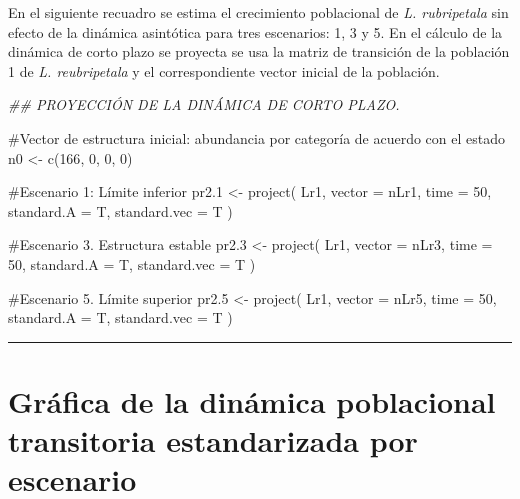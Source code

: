 \documentclass[
  12pt,
  letterpaper,
]{book}
\newenvironment{Shaded}{\begin{snugshade}}{\end{snugshade}}
\newcommand{\AttributeTok}[1]{\textcolor[rgb]{0.40,0.45,0.13}{#1}}
\newcommand{\CommentTok}[1]{\textcolor[rgb]{0.37,0.37,0.37}{#1}}
\newcommand{\DecValTok}[1]{\textcolor[rgb]{0.68,0.00,0.00}{#1}}
\newcommand{\DocumentationTok}[1]{\textcolor[rgb]{0.37,0.37,0.37}{\textit{#1}}}
\newcommand{\FloatTok}[1]{\textcolor[rgb]{0.68,0.00,0.00}{#1}}
\newcommand{\FunctionTok}[1]{\textcolor[rgb]{0.28,0.35,0.67}{#1}}
\newcommand{\NormalTok}[1]{\textcolor[rgb]{0.00,0.23,0.31}{#1}}
\newcommand{\OtherTok}[1]{\textcolor[rgb]{0.00,0.23,0.31}{#1}}
\begin{document}
En el siguiente recuadro se estima el crecimiento poblacional de
\emph{L. rubripetala} sin efecto de la dinámica asintótica para tres
escenarios: 1, 3 y 5. En el cálculo de la dinámica de corto plazo se
proyecta se usa la matriz de transición de la población 1 de \emph{L.
reubripetala} y el correspondiente vector inicial de la población.

\begin{Shaded}
\begin{Highlighting}[]
\DocumentationTok{\#\# PROYECCIÓN DE LA DINÁMICA DE CORTO PLAZO. }

\CommentTok{\#Vector de estructura inicial: abundancia por categoría de acuerdo con  el estado}
\NormalTok{n0 }\OtherTok{\textless{}{-}} \FunctionTok{c}\NormalTok{(}\DecValTok{166}\NormalTok{, }\DecValTok{0}\NormalTok{, }\DecValTok{0}\NormalTok{, }\DecValTok{0}\NormalTok{)}

\CommentTok{\#Escenario 1: Límite inferior}
\NormalTok{pr2}\FloatTok{.1} \OtherTok{\textless{}{-}} \FunctionTok{project}\NormalTok{(}
\NormalTok{  Lr1,}
  \AttributeTok{vector =}\NormalTok{ nLr1,}
  \AttributeTok{time =} \DecValTok{50}\NormalTok{,}
  \AttributeTok{standard.A =}\NormalTok{ T,}
  \AttributeTok{standard.vec =}\NormalTok{ T}
\NormalTok{)}

\CommentTok{\#Escenario 3. Estructura estable}
\NormalTok{pr2}\FloatTok{.3} \OtherTok{\textless{}{-}} \FunctionTok{project}\NormalTok{(}
\NormalTok{  Lr1,}
  \AttributeTok{vector =}\NormalTok{ nLr3,}
  \AttributeTok{time =} \DecValTok{50}\NormalTok{,}
  \AttributeTok{standard.A =}\NormalTok{ T,}
  \AttributeTok{standard.vec =}\NormalTok{ T}
\NormalTok{)}

\CommentTok{\#Escenario 5. Límite superior}
\NormalTok{pr2}\FloatTok{.5} \OtherTok{\textless{}{-}} \FunctionTok{project}\NormalTok{(}
\NormalTok{  Lr1,}
  \AttributeTok{vector =}\NormalTok{ nLr5,}
  \AttributeTok{time =} \DecValTok{50}\NormalTok{,}
  \AttributeTok{standard.A =}\NormalTok{ T,}
  \AttributeTok{standard.vec =}\NormalTok{ T}
\NormalTok{)}
\end{Highlighting}
\end{Shaded}

\begin{center}\rule{0.5\linewidth}{0.5pt}\end{center}

\section{Gráfica de la dinámica poblacional transitoria estandarizada
por
escenario}\label{gruxe1fica-de-la-dinuxe1mica-poblacional-transitoria-estandarizada-por-escenario}
\end{document}
